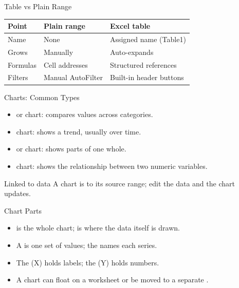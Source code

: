 \documentclass[aspectratio=169]{beamer}
\begin{document}
\begin{frame}{Table vs Plain Range}
  \begin{center}
    \begin{tabular}{lll}
      \toprule
      \textbf{Point} & \textbf{Plain range} & \textbf{Excel table} \\
      \midrule
      Name & None & Assigned name (Table1) \\
      Grows & Manually & Auto-expands \\
      Formulas & Cell addresses & Structured references \\
      Filters & Manual AutoFilter & Built-in header buttons \\
      \bottomrule
    \end{tabular}
  \end{center}
  \vspace{0.25cm}
\end{frame}

\begin{frame}{Charts: Common Types}
  \begin{itemize}
    \item {} or  chart: compares values across categories.
    \item {} chart: shows a trend, usually over time.
    \item {} or  chart: shows parts of one whole.
    \item {} chart: shows the relationship between two numeric
      variables.
  \end{itemize}
  \begin{block}{Linked to data}
    A chart is  to its source range; edit the data and the chart
    updates.
  \end{block}
\end{frame}

\begin{frame}{Chart Parts}
  \begin{itemize}
    \item {} is the whole chart;  is where the data
      itself is drawn.
    \item A  is one set of values; the  names each
      series.
    \item The  (X) holds labels; the  (Y)
      holds numbers.
    \item A chart can float on a worksheet or be moved to a separate
      .
  \end{itemize}
\end{frame}
\end{document}

